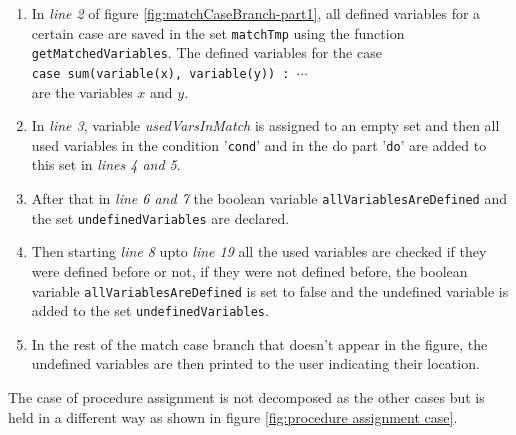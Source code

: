 \documentclass[11pt]{report}
\begin{document}
\begin{enumerate}
\item In \textsl{line 2} of figure \ref{fig:matchCaseBranch-part1}, all defined variables for a certain case are saved in the set \texttt{matchTmp} using the function \texttt{getMatchedVariables}. The defined variables for the case
\\[0.2cm]
\hspace*{0.6cm} 
\texttt{case sum(variable(x), variable(y)) : $\cdots$}
\\[0.2cm]
are the variables $x$ and $y$.

\item In \textsl{line 3}, variable \textsl{usedVarsInMatch} is assigned to an empty set and then all used variables in the condition '\texttt{cond}' and in the do part '\texttt{do}' are added to this set in \textsl{lines 4 and 5}.

\item After that in \textsl{line 6 and 7} the boolean variable \texttt{allVariablesAreDefined} and the set \texttt{undefinedVariables} are declared.

\item Then starting \textsl{line 8} upto \textsl{line 19} all the used variables are checked if they were defined before or not, if they were not defined before, the boolean variable \texttt{allVariablesAreDefined} is set to false and the undefined variable is added to the set \texttt{undefinedVariables}.

\item In the rest of the match case branch that doesn't appear in the figure, the undefined variables are then printed to the user indicating their location.

\end{enumerate}

The case of procedure assignment is not decomposed as the other cases but is held in a different way as shown in figure \ref{fig:procedure assignment case}.
\end{document}
